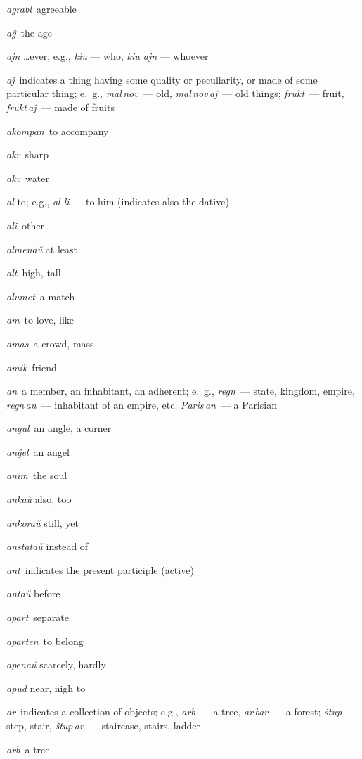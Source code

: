 \begin{landscape}
\begin{multicols}{5}
\begin{outdent}{1em}
\emph{agrabl\,} agreeable

\emph{aĝ\,} the age

\emph{ajn} \ldots{}ever; e.g., \emph{kiu} — who, \emph{kiu ajn} — whoever

\emph{aĵ\,} indicates a thing having some quality or peculiarity, or made of some particular thing; e.~g., \emph{mal\,nov\,} — old, \emph{mal\,nov\,aĵ\,} — old things; \emph{frukt\,} — fruit, \emph{frukt\,aĵ\,} — made of fruits

\emph{akompan\,} to accompany

\emph{akr\,} sharp

\emph{akv\,} water

\emph{al} to; e.g., \emph{al li} — to him (indicates also the dative)

\emph{ali\,} other

\emph{almenaŭ} at least

\emph{alt\,} high, tall

\emph{alumet\,} a match

\emph{am\,} to love, like

\emph{amas\,} a crowd, mass

\emph{amik\,} friend

\emph{an\,} a member, an inhabitant, an adherent; e.~g., \emph{regn\,} — state, kingdom, empire, \emph{regn\,an\,} — inhabitant of an empire, etc. \emph{Paris\,an\,} — a Parisian

\emph{angul\,} an angle, a corner

\emph{anĝel\,} an angel

\emph{anim\,} the soul

\emph{ankaŭ} also, too

\emph{ankoraŭ} still, yet

\emph{anstataŭ} instead of

\emph{ant\,} indicates the present participle (active)

\emph{antaŭ} before

\emph{apart\,} separate

\emph{aparten\,} to belong

\emph{apenaŭ} scarcely, hardly

\emph{apud} near, nigh to

\emph{ar\,} indicates a collection of objects; e.g., \emph{arb\,} — a tree, \emph{ar\,bar\,} — a forest; \emph{ŝtup\,} — step, stair, \emph{ŝtup\,ar\,} — staircase, stairs, ladder

\emph{arb\,} a tree


\end{outdent}
\end{multicols}
\end{landscape}
